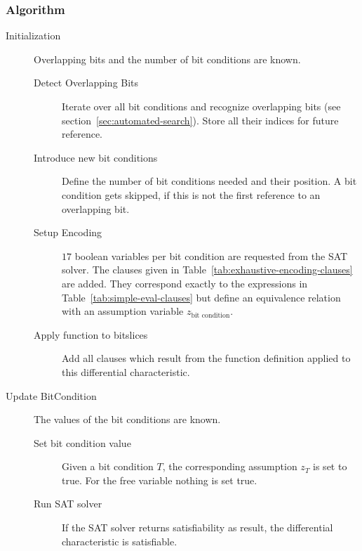 \subsubsection{Algorithm}
\label{sec:exhaustive-encoding-algorithm}
%
\begin{description}
  \item[Initialization] Overlapping bits and the number of bit conditions are known.
    \begin{description}
      \item[Detect Overlapping Bits] Iterate over all bit conditions and recognize overlapping bits (see section~\ref{sec:automated-search}). Store all their indices for future reference.
      \item[Introduce new bit conditions] Define the number of bit conditions needed and their position. A bit condition gets skipped, if this is not the first reference to an overlapping bit.
      \item[Setup Encoding] $17$ boolean variables per bit condition are requested from the SAT solver. The clauses given in Table~\ref{tab:exhaustive-encoding-clauses} are added. They correspond exactly to the expressions in Table~\ref{tab:simple-eval-clauses} but define an equivalence relation with an assumption variable $z_{\text{bit condition}}$.
      \item[Apply function to bitslices] Add all clauses which result from the function definition applied to this differential characteristic.
    \end{description}
  \item[Update BitCondition] The values of the bit conditions are known.
    \begin{description}
      \item[Set bit condition value] Given a bit condition $T$, the corresponding assumption $z_T$ is set to true. For the free variable nothing is set true.
      \item[Run SAT solver] If the SAT solver returns satisfiability as result, the differential characteristic is satisfiable.
    \end{description}
\end{description}


